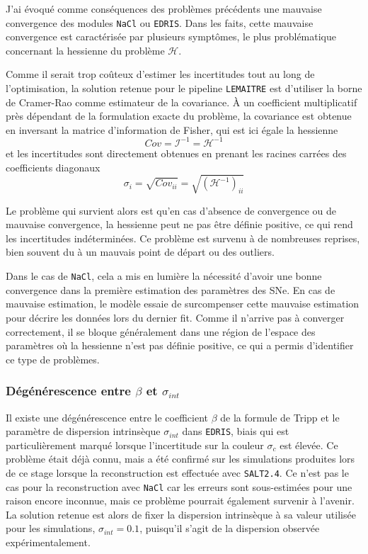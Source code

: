 \documentclass{book}
\def\lemaitre{\texttt{LEMAITRE}\xspace}
\def\nacl{\texttt{NaCl}\xspace}
\def\edris{\texttt{EDRIS}\xspace}
\def\saltd{\texttt{SALT2.4}\xspace}
\let\mcl\mathcal
\begin{document}
J'ai évoqué comme conséquences des problèmes précédents une mauvaise convergence des modules \nacl ou \edris. Dans les faits, cette mauvaise convergence est caractérisée par plusieurs symptômes, le plus problématique concernant la hessienne du problème $\mcl H$.

Comme il serait trop coûteux d'estimer les incertitudes tout au long de l'optimisation, la solution retenue pour le pipeline \lemaitre est d'utiliser la borne de Cramer-Rao comme estimateur de la covariance. À un coefficient multiplicatif près dépendant de la formulation exacte du problème, la covariance est obtenue en inversant la matrice d'information de Fisher, qui est ici égale la hessienne 
\begin{equation}
	Cov = \mcl I^{-1} = \mcl H^{-1}
\end{equation}
et les incertitudes sont directement obtenues en prenant les racines carrées des coefficients diagonaux
\begin{equation}
	\sigma_i = \sqrt{Cov_{ii}} = \sqrt{(\mcl H^{-1})_{ii}}
\end{equation}

Le problème qui survient alors est qu'en cas d'absence de convergence ou de mauvaise convergence, la hessienne peut ne pas être définie positive, ce qui rend les incertitudes indéterminées. Ce problème est survenu à de nombreuses reprises, bien souvent du à un mauvais point de départ ou des outliers.

Dans le cas de \nacl, cela a mis en lumière la nécessité d'avoir une bonne convergence dans la première estimation des paramètres des SNe. En cas de mauvaise estimation, le modèle essaie de surcompenser cette mauvaise estimation pour décrire les données lors du dernier fit. Comme il n'arrive pas à converger correctement, il se bloque généralement dans une région de l'espace des paramètres où la hessienne n'est pas définie positive, ce qui a permis d'identifier ce type de problèmes.

\subsubsection{Dégénérescence entre $\beta$ et $\sigma_{int}$} 

Il existe une dégénérescence entre le coefficient $\beta$ de la formule de Tripp et le paramètre de dispersion intrinsèque $\sigma_{int}$ dans \edris, biais qui est particulièrement marqué lorsque l'incertitude sur la couleur $\sigma_c$ est élevée. Ce problème était déjà connu, mais a été confirmé sur les simulations produites lors de ce stage lorsque la reconstruction est effectuée avec \saltd. Ce n'est pas le cas pour la reconstruction avec \nacl car les erreurs sont sous-estimées pour une raison encore inconnue, mais ce problème pourrait également survenir à l'avenir. La solution retenue est alors de fixer la dispersion intrinsèque à sa valeur utilisée pour les simulations, $\sigma_{int} = 0.1$, puisqu'il s'agit de la dispersion observée expérimentalement.
\end{document}
